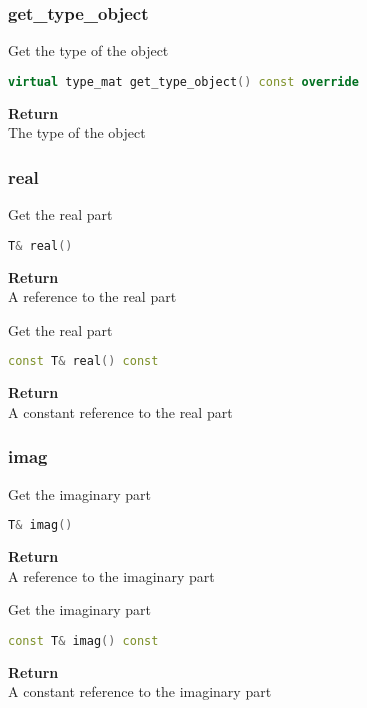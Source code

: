 \subsubsection{get\_type\_object}
\begin{mdframed}
Get the type of the object
\begin{lstlisting}[language=C++]
virtual type_mat get_type_object() const override 
\end{lstlisting}
\textbf{Return} \\ 
The type of the object\\ 
\end{mdframed}

\subsubsection{real}
\begin{mdframed}
Get the real part
\begin{lstlisting}[language=C++]
T& real()
\end{lstlisting}
\textbf{Return} \\ 
A reference to the real part\\ 
\end{mdframed}

\begin{mdframed}
Get the real part
\begin{lstlisting}[language=C++]
const T& real() const
\end{lstlisting}
\textbf{Return} \\ 
A constant reference to the real part\\ 
\end{mdframed}

\subsubsection{imag}
\begin{mdframed}
Get the imaginary part
\begin{lstlisting}[language=C++]
T& imag()
\end{lstlisting}
\textbf{Return} \\ 
A reference to the imaginary part\\ 
\end{mdframed}

\begin{mdframed}
Get the imaginary part
\begin{lstlisting}[language=C++]
const T& imag() const
\end{lstlisting}
\textbf{Return} \\ 
A constant reference to the imaginary part\\ 
\end{mdframed}

